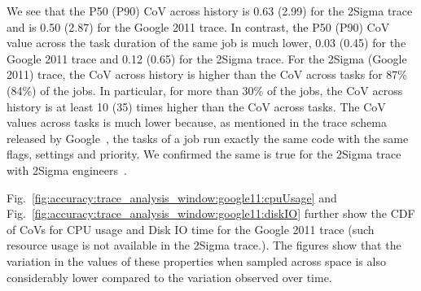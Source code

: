 We see that the P50 (P90) CoV across history is 0.63 (2.99) for the
2Sigma trace and is 0.50 (2.87) for the Google 2011 trace.
In contrast, the P50 (P90) CoV value across the task duration of the
same job is much lower, 0.03 (0.45) for the Google 2011 trace and 0.12 (0.65) for the
2Sigma trace.
%
%
{For the 2Sigma (Google 2011) trace, the CoV across history is higher than the CoV across
  tasks for 87\% (84\%) of the jobs.
  In particular, for more than 30\% of the jobs,
  the CoV across history is at least 10 (35) times higher than the CoV across tasks.
}
The CoV values across tasks is much lower
because, as
mentioned in the trace schema released by
Google~\cite{googleClusterData2011-2Schema}, the tasks of a job run
exactly the same code with the same flags, settings and priority.
{We confirmed the same is true for the 2Sigma trace
with 2Sigma {engineers}~\cite{personalCommunication:MarkAstley}.  }

{Fig.~\ref{fig:accuracy:trace_analysis_window:google11:cpuUsage} and
Fig.~\ref{fig:accuracy:trace_analysis_window:google11:diskIO} further show the
CDF of CoVs for CPU usage and Disk IO time for the Google 2011 trace (such resource
usage is not available in the 2Sigma trace.).
%
The figures show that the variation in the values of these properties when
sampled across space is also considerably lower compared to the variation
observed over time.
}

